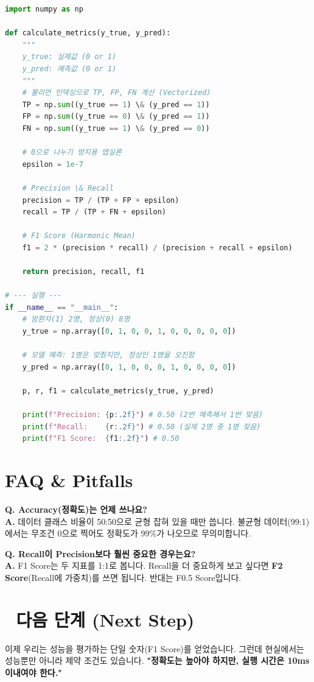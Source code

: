 \documentclass[11pt,a4paper]{book}
\theoremstyle{definition}
\begin{document}
\begin{lstlisting}[language=Python, caption=Precision, Recall, F1 Implementation, breaklines=true]
import numpy as np

def calculate_metrics(y_true, y_pred):
    """
    y_true: 실제값 (0 or 1)
    y_pred: 예측값 (0 or 1)
    """
    # 불리언 인덱싱으로 TP, FP, FN 계산 (Vectorized)
    TP = np.sum((y_true == 1) \& (y_pred == 1))
    FP = np.sum((y_true == 0) \& (y_pred == 1))
    FN = np.sum((y_true == 1) \& (y_pred == 0))
    
    # 0으로 나누기 방지용 엡실론
    epsilon = 1e-7
    
    # Precision \& Recall
    precision = TP / (TP + FP + epsilon)
    recall = TP / (TP + FN + epsilon)
    
    # F1 Score (Harmonic Mean)
    f1 = 2 * (precision * recall) / (precision + recall + epsilon)
    
    return precision, recall, f1

# --- 실행 ---
if __name__ == "__main__":
    # 암환자(1) 2명, 정상(0) 8명
    y_true = np.array([0, 1, 0, 0, 1, 0, 0, 0, 0, 0])
    
    # 모델 예측: 1명은 맞췄지만, 정상인 1명을 오진함
    y_pred = np.array([0, 1, 0, 0, 0, 1, 0, 0, 0, 0])
    
    p, r, f1 = calculate_metrics(y_true, y_pred)
    
    print(f"Precision: {p:.2f}") # 0.50 (2번 예측해서 1번 맞음)
    print(f"Recall:    {r:.2f}") # 0.50 (실제 2명 중 1명 찾음)
    print(f"F1 Score:  {f1:.2f}") # 0.50
\end{lstlisting}

\section{FAQ \& Pitfalls}

\textbf{Q. Accuracy(정확도)는 언제 쓰나요?} \\
\textbf{A.} 데이터 클래스 비율이 50:50으로 균형 잡혀 있을 때만 씁니다. 불균형 데이터(99:1)에서는 무조건 0으로 찍어도 정확도가 99\%가 나오므로 무의미합니다.

\textbf{Q. Recall이 Precision보다 훨씬 중요한 경우는요?} \\
\textbf{A.} F1 Score는 두 지표를 1:1로 봅니다. Recall을 더 중요하게 보고 싶다면 \textbf{F2 Score}(Recall에 가중치)를 쓰면 됩니다. 반대는 F0.5 Score입니다.

\section*{🔗 다음 단계 (Next Step)}
이제 우리는 성능을 평가하는 단일 숫자(F1 Score)를 얻었습니다.
그런데 현실에서는 성능뿐만 아니라 제약 조건도 있습니다. \textbf{"정확도는 높아야 하지만, 실행 시간은 10ms 이내여야 한다."}
\end{document}
